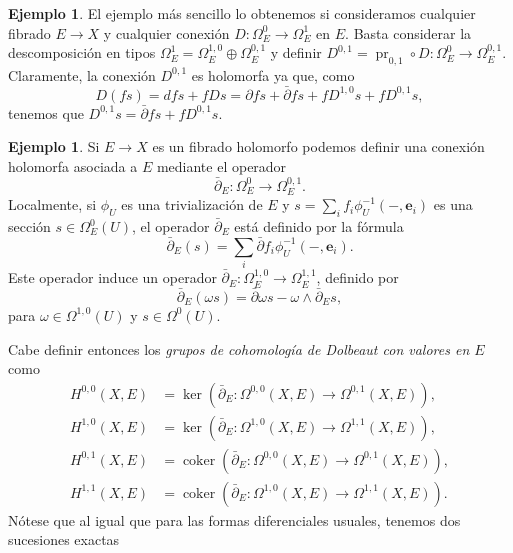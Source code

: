 \documentclass[12pt,a4paper]{article}
\theoremstyle{definition} \newtheorem{defn}[thm]{Definición}
\theoremstyle{definition} \newtheorem{ejemplo}[thm]{Ejemplo}
\theoremstyle{definition} \newtheorem{ejercicio}[thm]{Ejercicio}
\def\delbar{\bar{\partial}}
\DeclareMathOperator{\coker}{coker}
\DeclareMathOperator{\pr}{pr}
\begin{document}
\begin{ejemplo}
  El ejemplo más sencillo lo obtenemos si consideramos cualquier fibrado $E\rightarrow X$ y cualquier conexión $D:\Omega^0_E \rightarrow \Omega^{1}_E$ en $E$. Basta considerar la descomposición en tipos $\Omega^1_E = \Omega^{1,0}_E \oplus \Omega^{0,1}_E$ y definir $D^{0,1}=\pr_{0,1} \circ D: \Omega^0_E \rightarrow \Omega^{0,1}_E$. Claramente, la conexión $D^{0,1}$ es holomorfa ya que, como $$D(fs)= df s + f Ds = \partial f s + \delbar f s + f D^{1,0} s + f D^{0,1} s,$$
  tenemos que $D^{0,1}s = \delbar f s + f D^{0,1} s$.
\end{ejemplo}

\begin{ejemplo}
	      Si $E\rightarrow X$ es un fibrado holomorfo podemos definir una conexión holomorfa asociada a $E$ mediante el operador
	      \begin{equation*}
		\delbar_E :\Omega^0_E \longrightarrow \Omega^{0,1}_E.
		\end{equation*}
		Localmente, si $\phi_U$ es una trivialización de $E$ y $s=\sum_i f_i \phi_U^{-1}(-,\mathbf{e}_i)$ es una sección $s\in \Omega^0_E(U)$, el operador $\delbar_E$ está definido por la fórmula
		\begin{equation*}
		  \delbar_E (s) = \sum_i \delbar f_i \phi_U^{-1}(-,\mathbf{e}_i).
		\end{equation*}
		Este operador induce un operador $\delbar_E:\Omega_E^{1,0} \rightarrow \Omega_E^{1,1}$, definido por
		\begin{equation*}
		  \delbar_E(\omega s) = \delbar \omega s - \omega \wedge \delbar_E s,
		\end{equation*}
		para $\omega \in \Omega^{1,0}(U)$ y $s\in \Omega^0(U)$. 

		Cabe definir entonces los \emph{grupos de cohomología de Dolbeaut con valores en $E$} como
		\begin{align*}
    H^{0,0}(X,E)&=\ker(\delbar_E:\Omega^{0,0}(X,E) \rightarrow \Omega^{0,1}(X,E)), \\
    H^{1,0}(X,E)&=\ker(\delbar_E:\Omega^{1,0}(X,E) \rightarrow \Omega^{1,1}(X,E)), \\
    H^{0,1}(X,E)&=\coker(\delbar_E:\Omega^{0,0}(X,E) \rightarrow \Omega^{0,1}(X,E)), \\
    H^{1,1}(X,E)&=\coker(\delbar_E:\Omega^{1,0}(X,E) \rightarrow \Omega^{1,1}(X,E)) .
		\end{align*}
		Nótese que al igual que para las formas diferenciales usuales, tenemos dos sucesiones exactas


\end{ejemplo}
\end{document}
